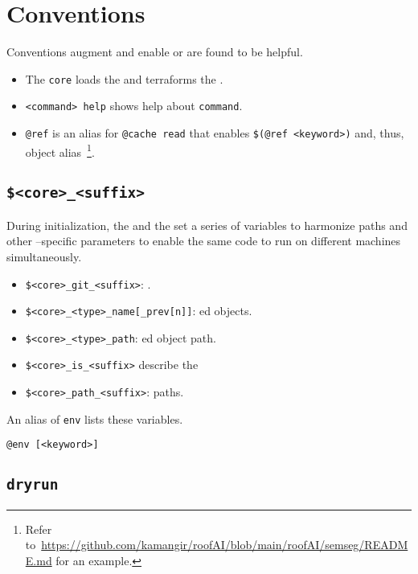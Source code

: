 \section{Conventions}
\label{conventions}
\label{core}
\label{help}

Conventions augment and enable  or are found to be helpful.
%
\begin{itemize}
    \item The \texttt{core} loads the  and terraforms the .
    \item \texttt{<command> help} shows help about \texttt{command}.
    \item \texttt{@ref} is an alias for \texttt{@cache read} that enables \texttt{\$(@ref <keyword>)} and, thus, object alias~\footnote{Refer to~\url{https://github.com/kamangir/roofAI/blob/main/roofAI/semseg/README.md} for an example.}.
\end{itemize}  

\subsection{\texttt{\$<core>\_<suffix>}}
\label{awareness}

During initialization, the  and the  set a series of variables to harmonize paths and other --specific parameters to enable the same code to run on different machines simultaneously. 
%
\begin{itemize}
    \item{\texttt{\$<core>\_git\_<suffix>}: .}
    \item{\texttt{\$<core>\_<type>\_name[\_prev[n]]}: ed objects.}
    \item{\texttt{\$<core>\_<type>\_path}: ed object path.}
    \item{\texttt{\$<core>\_is\_<suffix>} describe the }
    \item{\texttt{\$<core>\_path\_<suffix>}: paths.}
\end{itemize}
%
An alias of \texttt{env} lists these variables.
%
\begin{verbatim}
@env [<keyword>]
\end{verbatim}

\subsection{\texttt{dryrun}}
\label{dryrun}

